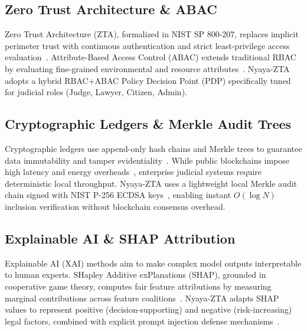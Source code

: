 \documentclass[10pt,conference,two-column]{IEEEtran}
\begin{document}
\subsection{Zero Trust Architecture \& ABAC}
Zero Trust Architecture (ZTA), formalized in NIST SP 800-207, replaces implicit perimeter trust with continuous authentication and strict least-privilege access evaluation~\cite{kindervag2010build, rose2020zero}. Attribute-Based Access Control (ABAC) extends traditional RBAC by evaluating fine-grained environmental and resource attributes~\cite{hu2014guide, ferraiolo1992role}. Nyaya-ZTA adopts a hybrid RBAC+ABAC Policy Decision Point (PDP) specifically tuned for judicial roles (Judge, Lawyer, Citizen, Admin).

\subsection{Cryptographic Ledgers \& Merkle Audit Trees}
Cryptographic ledgers use append-only hash chains and Merkle trees to guarantee data immutability and tamper evidentiality~\cite{merkle1989digital, haber1991how}. While public blockchains impose high latency and energy overheads~\cite{nakamoto2008bitcoin}, enterprise judicial systems require deterministic local throughput. Nyaya-ZTA uses a lightweight local Merkle audit chain signed with NIST P-256 ECDSA keys~\cite{nist2013fips186}, enabling instant $O(\log N)$ inclusion verification without blockchain consensus overhead.

\subsection{Explainable AI \& SHAP Attribution}
Explainable AI (XAI) methods aim to make complex model outputs interpretable to human experts. SHapley Additive exPlanations (SHAP), grounded in cooperative game theory, computes fair feature attributions by measuring marginal contributions across feature coalitions~\cite{lundberg2017unified, shapley1953value}. Nyaya-ZTA adapts SHAP values to represent positive (decision-supporting) and negative (risk-increasing) legal factors, combined with explicit prompt injection defense mechanisms~\cite{perez2022ignore, greshake2023not}.
\end{document}
